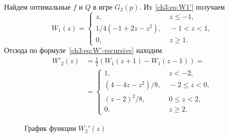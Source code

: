 {\begin{example}
  Найдем оптимальные $f$ и $Q$ в игре $G_2(p)$.
  Из~\eqref{ch3:eq:W1'} получаем
  \begin{equation*}
    W_1(z) = \begin{cases}
      z, &\; z \leqslant -1,\\
      1/4 (-1 + 2z - z^2), &\; -1 < z < 1,\\
      0, &\; z \geqslant 1.
    \end{cases}
  \end{equation*}
  Отсюда по формуле~\eqref{ch3:eq:W'-recursive} находим
  \begin{align*}
    W'_2(z) 
    &= \frac{1}{2} \left( W_1(z+1) - W_1(z-1) \right) =\\
    &= \begin{cases}
      1, &\; z < -2,\\
      (4 - 4z - z^2)/8, &\; -2 \leqslant z < 0,\\
      (z - 2)^2/8, &\; 0 \leqslant z < 2,\\
      0, &\; z \geqslant 2.
    \end{cases}
  \end{align*}

  \begin{figure}[hbt]
    \centering 
    \caption{График функции $W_2'(z)$}
    \label{ch3:fig:W2}
  \end{figure}


\end{example}}

